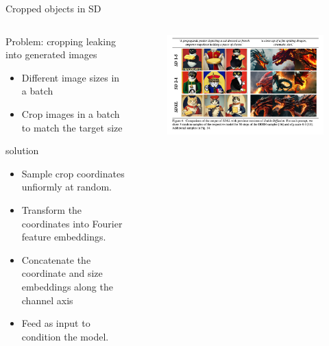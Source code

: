 \documentclass[8pt]{beamer}
\begin{document}
\begin{frame}{Cropped objects in SD}
    \begin{columns}
        \begin{column}{0.5\textwidth}
            Problem: cropping leaking into generated images
            \begin{itemize}
                \item Different image sizes in a batch
                \item Crop images in a batch to match the target size
            \end{itemize}
            \vspace{0.3cm}
            solution
            \begin{itemize}
                \item Sample crop coordinates unfiormly at random.
                \item Transform the coordinates into Fourier feature embeddings.
                \item Concatenate the coordinate and size embeddings along the channel axis
                \item Feed as input to condition the model.
            \end{itemize}
        \end{column}
        \begin{column}{0.5\textwidth}
           \begin{figure}
               \includegraphics[scale=0.2]{images/crop_example_sdxl}
               \label{fig:crop_example_sdxl}
           \end{figure}~\cite{podell2023sdxl}
        \end{column}
    \end{columns}
\end{frame}
\end{document}
